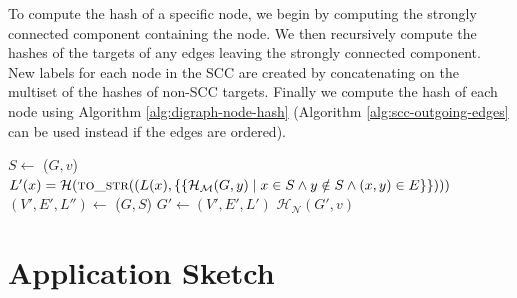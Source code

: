 \documentclass[twoside,leqno]{article}
\begin{document}
To compute the hash of a specific node, we begin by computing the strongly connected component containing the node. We then recursively compute the hashes of the targets of any edges leaving the strongly connected component. New labels for each node in the SCC are created by concatenating on the multiset of the hashes of non-SCC targets. Finally we compute the hash of each node using Algorithm \ref{alg:digraph-node-hash} (Algorithm \ref{alg:scc-outgoing-edges} can be used instead if the edges are ordered).

\begin{algorithm}
    \caption{Merkle Graph Node Hashing}\label{alg:merklegraphhash}
    \begin{algorithmic}[1]
        \State $S \gets$ ($G, v$) 
        \State $L'(x)=\mathcal{H}(\textproc{to\_str}((L(x),\{\{\mathcal{H_M}(G,y) \mid x \in S \land y \notin S \land (x,y) \in E\}\})))$ \\ 
        \State $(V', E', L'') \gets$ ($G, S$)
        \State $G' \gets (V',E',L')$
        \State \Return $\mathcal{H_N}(G', v)$ 
    \EndFunction
    \end{algorithmic}
\end{algorithm}

\section{Application Sketch}
\end{document}
